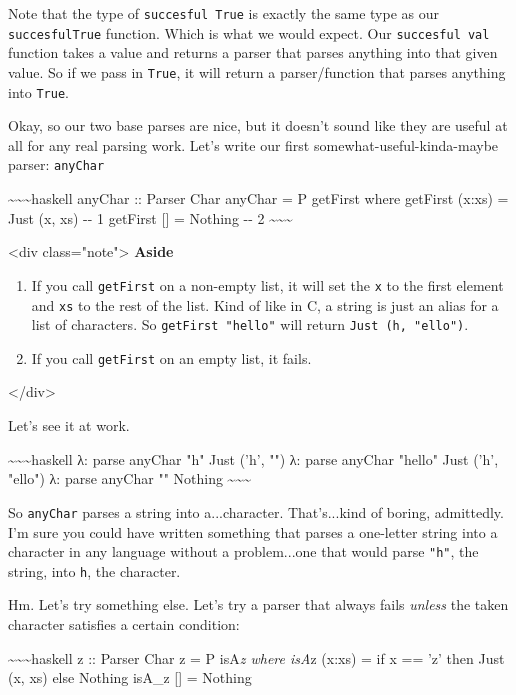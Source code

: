\documentclass[]{article}
\begin{document}
Note that the type of \texttt{succesful\ True} is exactly the same type as our
\texttt{succesfulTrue} function. Which is what we would expect. Our
\texttt{succesful\ val} function takes a value and returns a parser that parses
anything into that given value. So if we pass in \texttt{True}, it will return a
parser/function that parses anything into \texttt{True}.

Okay, so our two base parses are nice, but it doesn't sound like they are useful
at all for any real parsing work. Let's write our first
somewhat-useful-kinda-maybe parser: \texttt{anyChar}

\textasciitilde{}\textasciitilde{}\textasciitilde{}haskell anyChar :: Parser
Char anyChar = P getFirst where getFirst (x:xs) = Just (x, xs) -\/- 1 getFirst
{[}{]} = Nothing -\/- 2 \textasciitilde{}\textasciitilde{}\textasciitilde{}

\textless{}div class="note"\textgreater{} \textbf{Aside}

\begin{enumerate}
\tightlist
\item
  If you call \texttt{getFirst} on a non-empty list, it will set the \texttt{x}
  to the first element and \texttt{xs} to the rest of the list. Kind of like in
  C, a string is just an alias for a list of characters. So
  \texttt{getFirst\ "hello"} will return
  \texttt{Just\ (\textquotesingle{}h\textquotesingle{},\ "ello")}.
\item
  If you call \texttt{getFirst} on an empty list, it fails.
\end{enumerate}

\textless{}/div\textgreater{}

Let's see it at work.

\textasciitilde{}\textasciitilde{}\textasciitilde{}haskell λ: parse anyChar "h"
Just ('h', "") λ: parse anyChar "hello" Just ('h', "ello") λ: parse anyChar ""
Nothing \textasciitilde{}\textasciitilde{}\textasciitilde{}

So \texttt{anyChar} parses a string into a...character. That's...kind of boring,
admittedly. I'm sure you could have written something that parses a one-letter
string into a character in any language without a problem...one that would parse
\texttt{"h"}, the string, into \texttt{\textquotesingle{}h\textquotesingle{}},
the character.

Hm. Let's try something else. Let's try a parser that always fails \emph{unless}
the taken character satisfies a certain condition:

\textasciitilde{}\textasciitilde{}\textasciitilde{}haskell z :: Parser Char z =
P isA\emph{z where isA}z (x:xs) = if x == 'z' then Just (x, xs) else Nothing
isA\_z {[}{]} = Nothing
\end{document}
